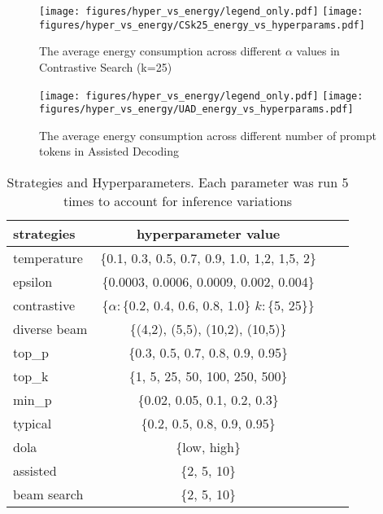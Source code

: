\begin{figure}[h]
    \centering
    \texttt{[image: figures/hyper\_vs\_energy/legend\_only.pdf]}
    \texttt{[image: figures/hyper\_vs\_energy/CSk25\_energy\_vs\_hyperparams.pdf]}
    \caption{The average energy consumption across different \( \alpha \) values in Contrastive Search (k=25)}
    \label{appendix:fig-CS25}
\end{figure}


\begin{figure}[h]
    \centering
    \texttt{[image: figures/hyper\_vs\_energy/legend\_only.pdf]}
    \texttt{[image: figures/hyper\_vs\_energy/UAD\_energy\_vs\_hyperparams.pdf]}
    \caption{The average energy consumption across different number of prompt tokens in Assisted Decoding}
    \label{appendix:fig-uad}
\end{figure}



\begin{table*}[b]
    \centering
    \caption{Strategies and Hyperparameters. Each parameter was run 5 times to account for inference variations}
    \vskip 0.15in
    \begin{small}
    \begin{sc}
    \begin{tabular}{lccr}
    \toprule
    \textbf{strategies} & \textbf{hyperparameter value} \\
    \midrule
    temperature & {\{0.1, 0.3, 0.5, 0.7, 0.9, 1.0, 1,2, 1,5, 2\}}\\ 
    epsilon & {\{0.0003,  0.0006,  0.0009,  0.002, 0.004\}}\\ 
    contrastive & {\{\(\alpha:\){\{0.2, 0.4, 0.6, 0.8, 1.0\}}  \(k:\){\{5, 25\}}\}}\\ 
    diverse beam & {\{(4,2), (5,5), (10,2), (10,5)\}}\\ 
    top\_p & {\{0.3, 0.5, 0.7, 0.8, 0.9, 0.95\}}\\ 
    top\_k & {\{1, 5, 25, 50, 100, 250, 500\}}\\  
    min\_p & {\{0.02, 0.05, 0.1, 0.2, 0.3\}}\\
    typical & {\{0.2, 0.5, 0.8, 0.9, 0.95\}}\\
    dola & {\{low, high\}}\\ 
    assisted & {\{2, 5, 10\}}\\ 
    beam search & {\{2, 5, 10\}}\\ 
    \bottomrule
    \end{tabular}
    \end{sc}
    \end{small}
    \label{table-hyper}
\end{table*}


